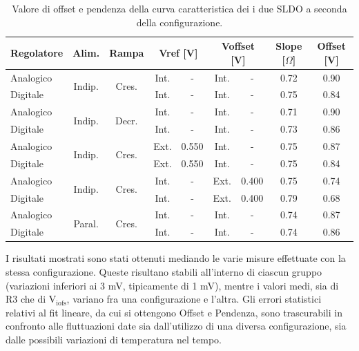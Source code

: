 \begin{center}
\begin{table}
\begin{tabular}{|l|c|c|c|c|c|c|c|c|}
\hline
Regolatore & Alim. & Rampa & \multicolumn{2}{c|}{Vref [V]} & \multicolumn{2}{c|}{Voffset [V]} & Slope [$\Omega$] & Offset [V]\\ \hline
 
Analogico & \multirow{2}{*}{Indip.} & \multirow{2}{*}{Cres.} & Int. & - & Int. & - & 0.72 & 0.90 \\
Digitale  &  &  & Int. & - & Int. & - & 0.75  & 0.84 \\ \hline

Analogico & \multirow{2}{*}{Indip.} & \multirow{2}{*}{Decr.} & Int. & - & Int. & - & 0.71 & 0.90 \\
Digitale  &  &  & Int. & - & Int. & - & 0.73  & 0.86 \\ \hline

Analogico & \multirow{2}{*}{Indip.} & \multirow{2}{*}{Cres.} & Ext. & 0.550 & Int. & - & 0.75 & 0.87 \\
Digitale  &  &  & Ext. & 0.550 & Int. & - & 0.75  & 0.84 \\ \hline

Analogico & \multirow{2}{*}{Indip.} & \multirow{2}{*}{Cres.} & Int. & - & Ext. & 0.400 & 0.75 & 0.74 \\
Digitale  &  &  & Int. & - & Ext. & 0.400 & 0.79  & 0.68 \\ \hline

Analogico & \multirow{2}{*}{Paral.} & \multirow{2}{*}{Cres.} & Int. & - & Int. & - & 0.74 & 0.87 \\
Digitale  &  &  & Int. & - & Int. & - & 0.74  & 0.86 \\ \hline
\end{tabular}
\caption{Valore di offset e pendenza della curva caratteristica dei i due SLDO a seconda della configurazione.}
\label{table:results}
\end{table}
\end{center}

I risultati mostrati sono stati ottenuti mediando le varie misure effettuate con la stessa configurazione.
Queste risultano stabili all'interno di ciascun gruppo (variazioni inferiori ai 3 mV, tipicamente di 1 mV), mentre i valori medi, sia di R3 che di $\mathrm{V_{iofs}}$, variano fra una configurazione e l'altra.
Gli errori statistici relativi al fit lineare, da cui si ottengono Offset e Pendenza, sono trascurabili in confronto alle fluttuazioni date sia dall'utilizzo di una diversa configurazione, sia dalle possibili variazioni di temperatura nel tempo. 

